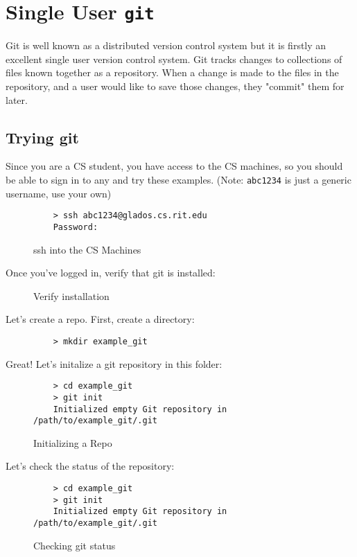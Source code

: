 \documentclass[11pt]{report}
\begin{document}
\chapter{Single User \texttt{git}}
Git is well known as a distributed version control system but it is
firstly an excellent single user version control system. 
Git tracks changes to collections of files known together as a repository.
When a change is made to the files in the repository, and a user would like
to save those changes, they "commit" them for later.

\section{Trying git}
Since you are a CS student,
you have access to the CS machines, so you should be able to sign in to any and
try these examples. (Note: \texttt{abc1234} is just a generic username, use your own)

\begin{figure}[H]
  \caption{ssh into the CS Machines}
  \begin{lstlisting}
    > ssh abc1234@glados.cs.rit.edu
    Password:
  \end{lstlisting}
\end{figure}

Once you've logged in, verify that git is installed:

\begin{figure}[H]\end{figure}
\begin{figure}[H]\caption{Verify installation}\end{figure}

Let's create a repo. First, create a directory:
\begin{figure}[H]
  \begin{lstlisting}
    > mkdir example_git
  \end{lstlisting}
\end{figure}

Great! Let's initalize a git repository in this folder:
\begin{figure}[H]
  \caption{Initializing a Repo}
  \begin{lstlisting}
    > cd example_git
    > git init
    Initialized empty Git repository in /path/to/example_git/.git
  \end{lstlisting}
\end{figure}

Let's check the status of the repository:
\begin{figure}[H]
  \caption{Checking git status}
  \begin{lstlisting}
    > cd example_git
    > git init
    Initialized empty Git repository in /path/to/example_git/.git
  \end{lstlisting}
\end{figure}
\end{document}
